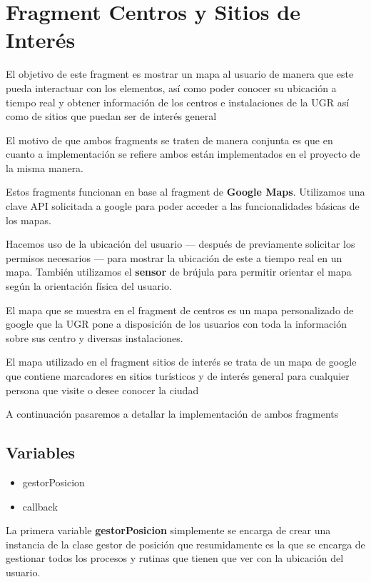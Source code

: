 \section{Fragment Centros y Sitios de Interés}
El objetivo de este fragment es mostrar un mapa al usuario de manera que este pueda interactuar con los elementos, así como poder conocer su ubicación a tiempo real y obtener información de los centros e instalaciones de la UGR así como de sitios que puedan ser de interés general

El motivo de que ambos fragments se traten de manera conjunta es que en cuanto a implementación se refiere ambos están implementados en el proyecto de la misma manera.

Estos fragments funcionan en base al fragment de \textbf{Google Maps}. Utilizamos una clave API solicitada a google para poder acceder a las funcionalidades básicas de los mapas.

Hacemos uso de la ubicación del usuario --- después de previamente solicitar los permisos necesarios --- para mostrar la ubicación de este a tiempo real en un mapa. También utilizamos el \textbf{sensor} de brújula para permitir orientar el mapa según la orientación física del usuario.

El mapa que se muestra en el fragment de centros es un mapa personalizado de google que la UGR pone a disposición de los usuarios con toda la información sobre sus centro y diversas instalaciones.

El mapa utilizado en el fragment sitios de interés se trata de un mapa de google que contiene marcadores en sitios turísticos y de interés general para cualquier persona que visite o desee conocer la ciudad

A continuación pasaremos a detallar la implementación de ambos fragments

\subsection{Variables}

\begin{itemize}
	\item gestorPosicion
	\item callback
\end{itemize}

La primera variable \textbf{gestorPosicion} simplemente se encarga de crear una instancia de la clase gestor de posición que resumidamente es la que se encarga de gestionar todos los procesos y rutinas que tienen que ver con la ubicación del usuario.

